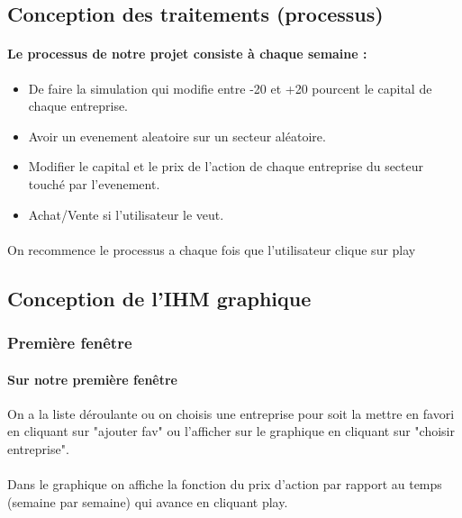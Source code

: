 \paragraph{} 
\paragraph{} 
\subsection{Conception des traitements (processus)}
\paragraph{Le processus de notre projet consiste à chaque semaine :}
\begin{itemize}
\item De faire la simulation qui modifie entre -20 et +20 pourcent le capital de chaque entreprise.
\item Avoir un evenement aleatoire sur un secteur aléatoire.
\item Modifier le capital et le prix de l'action de chaque entreprise du secteur touché par l'evenement.
\item Achat/Vente si l'utilisateur le veut.
\end{itemize}
\paragraph{}On recommence le processus a chaque fois que l'utilisateur clique sur play


\subsection{Conception de l'IHM graphique}
\subsubsection{Première fenêtre}
\paragraph{Sur notre première fenêtre} On a la liste déroulante ou on choisis une entreprise pour soit la mettre en favori en cliquant sur "ajouter fav" ou l'afficher sur le graphique en cliquant sur "choisir entreprise". 
\paragraph{} Dans le graphique on affiche la fonction du prix d'action par rapport au temps (semaine par semaine) qui avance en cliquant play.
